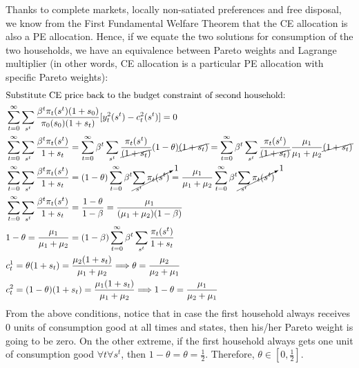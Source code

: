 \documentclass[]{article}
\begin{document}
Thanks to complete markets, locally non-satiated preferences and free disposal, we know from the First Fundamental Welfare Theorem that the CE allocation is also a PE allocation. Hence, if we equate the two solutions for consumption of the two households, we have an equivalence between Pareto weights and Lagrange multiplier (in other words, CE allocation is a particular PE allocation with specific Pareto weights):
\begin{equation}
	\begin{split}
		\intertext{Substitute CE price back to the budget constraint of second household:}
		&\sum\limits_{t = 0}^\infty\sum\limits_{s^t}\frac{\beta^t\pi_t(s^t)(1 + s_0)}{\pi_0(s_0)(1 + s_t)}[y_t^2(s^t) - c_t^2(s^t)] = 0 \\
		&\sum\limits_{t = 0}^\infty\sum\limits_{s^t}\frac{\beta^t\pi_t(s^t)}{1 + s_t} = \sum\limits_{t = 0}^\infty\beta^t\sum\limits_{s^t}\frac{\pi_t(s^t)}{\cancel{(1 + s_t)}}(1 - \theta)\cancel{(1 + s_t)} = \sum\limits_{t = 0}^\infty\beta^t\sum\limits_{s^t}\frac{\pi_t(s^t)}{\cancel{(1 + s_t)}}\frac{\mu_1}{\mu_1 + \mu_2}\cancel{(1 + s_t)}\\
		&\sum\limits_{t = 0}^\infty\sum\limits_{s^t}\frac{\beta^t\pi_t(s^t)}{1 + s_t} = (1 - \theta)\sum\limits_{t = 0}^\infty\beta^t\cancelto{1}{\sum\limits_{s^t}\pi_t(s^t)} = \frac{\mu_1}{\mu_1 + \mu_2}\sum\limits_{t = 0}^\infty\beta^t\cancelto{1}{\sum\limits_{s^t}\pi_t(s^t)}\\
		&\sum\limits_{t = 0}^\infty\sum\limits_{s^t}\frac{\beta^t\pi_t(s^t)}{1 + s_t} = \frac{1 - \theta}{1 - \beta} = \frac{\mu_1}{(\mu_1 + \mu_2)(1 - \beta)}\\
		&1 - \theta = \frac{\mu_1}{\mu_1 + \mu_2} = (1 - \beta)\sum\limits_{t = 0}^\infty\beta^t\sum\limits_{s^t}\frac{\pi_t(s^t)}{1 + s_t}\\
		&c_t^1 = \theta(1 + s_t) = \frac{\mu_2(1 + s_t)}{\mu_1 + \mu_2} \Longrightarrow \theta = \frac{\mu_2}{\mu_2 + \mu_1} \\
		&c_t^2 = (1 - \theta)(1 + s_t) = \frac{\mu_1(1 + s_t)}{\mu_1 + \mu_2} \Longrightarrow 1 - \theta = \frac{\mu_1}{\mu_2 + \mu_1} \nonumber
	\end{split}
\end{equation}
From the above conditions, notice that in case the first household always receives 0 units of consumption good at all times and states, then his/her Pareto weight is going to be zero. On the other extreme, if the first household always gets one unit of consumption good $\forall t \forall s^t$, then $1 - \theta = \theta = \frac{1}{2}$. Therefore, $\theta\in[0, \frac{1}{2}]$.
\end{document}
